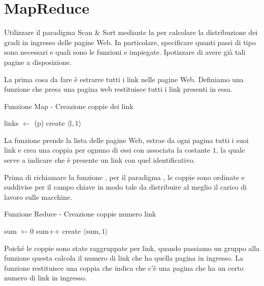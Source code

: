\chapter{MapReduce}

\begin{problem*}
    Utilizzare il paradigma Scan \& Sort mediante la \mapreduce per calcolare la
    distribuzione dei gradi in ingresso delle pagine Web. In particolare,
    specificare quanti passi di tipo \mapreduce sono necessari e quali sono le
    funzioni \map e \reduce impiegate. Ipotizzare di avere gi\`a tali pagine a
    disposizione.
\end{problem*}

La prima cosa da fare è estrarre tutti i link nelle pagine Web. Definiamo una
funzione \parser che presa una pagina web restituisce tutti i link presenti in
essa. 

\begin{algorithm}
    \caption{Funzione Map - Creazione coppie dei link}
    \begin{algorithmic}[1]
        		\State links \(\gets\) \parser(p)
        			\State create \(\langle\mbox{l},1\rangle\)
        		\EndFor
        	\EndFor
        \EndFunction
    \end{algorithmic}
\end{algorithm}

La funzione \map prende la lista delle pagine  Web, estrae da ogni pagina tutti
i suoi link e crea una coppia per ognuno di essi con associata la costante
\(1\), la quale serve a indicare che è presente un link con quel
identificativo.

Prima di richiamare la funzione \reduce, per il paradigma \mapreduce, le
coppie sono ordinate e suddivise per il campo chiave in modo tale da
distribuire al meglio il carico di lavoro sulle macchine. 

\begin{algorithm}
    \caption{Funzione Reduce - Creazione coppie numero link}
    \begin{algorithmic}[1]
      	  \State sum \(\gets 0\)
        		\State sum++
        	\EndFor
        	\State create \(\langle\mbox{sum},1\rangle\)
        \EndFunction
    \end{algorithmic}
\end{algorithm}


Poiché le coppie sono state raggruppate per link, quando passiamo un gruppo
alla funzione \reduce questa calcola il numero di link che ha quella pagina in
ingresso. La funzione restituisce una coppia che indica che c'è una pagina che
ha un certo numero di link in ingresso.


